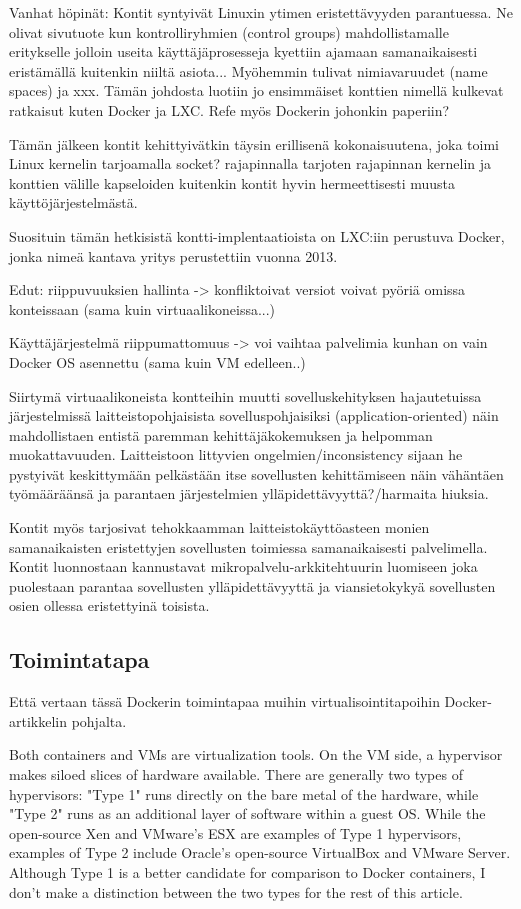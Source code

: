 \documentclass[finnish]{tktltiki2}
\theoremstyle{definition}
\theoremstyle{remark}
\begin{document}
Vanhat höpinät: Kontit syntyivät Linuxin ytimen eristettävyyden parantuessa. Ne olivat sivutuote kun kontrolliryhmien (control groups) mahdollistamalle eritykselle jolloin useita käyttäjäprosesseja kyettiin ajamaan samanaikaisesti eristämällä kuitenkin niiltä asiota... Myöhemmin tulivat nimiavaruudet (name spaces) ja xxx. Tämän johdosta luotiin jo ensimmäiset konttien nimellä kulkevat ratkaisut kuten Docker ja LXC. Refe myös Dockerin johonkin paperiin? \cite{borg-omega-kubernetes}

Tämän jälkeen kontit kehittyivätkin täysin erillisenä kokonaisuutena, joka toimi Linux kernelin tarjoamalla socket? rajapinnalla tarjoten rajapinnan kernelin ja konttien välille kapseloiden kuitenkin kontit hyvin hermeettisesti muusta käyttöjärjestelmästä.

Suosituin tämän hetkisistä kontti-implentaatioista on LXC:iin perustuva Docker, jonka nimeä kantava yritys perustettiin vuonna 2013.\cite{docker}

Edut: riippuvuuksien hallinta -> konfliktoivat versiot voivat pyöriä omissa konteissaan (sama kuin virtuaalikoneissa...)

Käyttäjärjestelmä riippumattomuus -> voi vaihtaa palvelimia kunhan on vain Docker OS asennettu (sama kuin VM edelleen..)

Siirtymä virtuaalikoneista kontteihin muutti sovelluskehityksen hajautetuissa järjestelmissä laitteistopohjaisista sovelluspohjaisiksi (application-oriented) näin mahdollistaen entistä paremman kehittäjäkokemuksen ja helpomman muokattavuuden. Laitteistoon littyvien ongelmien/inconsistency sijaan he pystyivät keskittymään pelkästään itse sovellusten kehittämiseen näin vähäntäen työmääräänsä ja parantaen järjestelmien ylläpidettävyyttä?/harmaita hiuksia.

Kontit myös tarjosivat tehokkaamman laitteistokäyttöasteen monien samanaikaisten eristettyjen sovellusten toimiessa samanaikaisesti palvelimella. Kontit luonnostaan kannustavat mikropalvelu-arkkitehtuurin luomiseen joka puolestaan parantaa sovellusten ylläpidettävyyttä ja viansietokykyä sovellusten osien ollessa eristettyinä toisista.

\subsection{Toimintatapa}

Että vertaan tässä Dockerin toimintapaa muihin virtualisointitapoihin Docker-artikkelin pohjalta.

Both containers and VMs are virtualization tools. On the VM side, a hypervisor makes siloed slices of hardware available. There are generally two types of hypervisors: "Type 1" runs directly on the bare metal of the hardware, while "Type 2" runs as an additional layer of software within a guest OS. While the open-source Xen and VMware's ESX are examples of Type 1 hypervisors, examples of Type 2 include Oracle's open-source VirtualBox and VMware Server. Although Type 1 is a better candidate for comparison to Docker containers, I don't make a distinction between the two types for the rest of this article.
\end{document}
